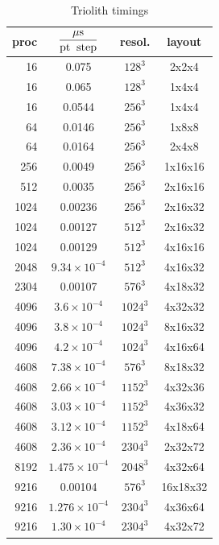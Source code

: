 \documentclass[\mydriver,12pt,twoside,notitlepage,a4paper]{article}
\begin{document}
\begin{table}[htb]
  \begin{center}
    \caption{Triolith timings}
    \label{Tsummary-Triolith}
    \begin{tabular}{rccc}
    \toprule
proc & $\displaystyle\frac{{\mu\rm s}}{\rm pt\;\;step}$ & resol. & layout \\
    \midrule
  16 &0.075& $128^3$ & 2x2x4  \\
  16 &0.065& $128^3$ & 1x4x4  \\
  16 &0.0544& $256^3$ & 1x4x4  \\  %
  64 &0.0146& $256^3$ & 1x8x8  \\  %
  64 &0.0164& $256^3$ & 2x4x8  \\
 256 &0.0049& $256^3$ & 1x16x16 \\ %
 512 &0.0035& $256^3$ & 2x16x16 \\ %
1024 &0.00236 &$256^3$ & 2x16x32 \\ %
1024 &0.00127 &$512^3$ & 2x16x32 \\ %
1024 &0.00129 &$512^3$ & 4x16x16 \\
2048 & $9.34{\times}10^{-4}$ &$ 512^3$&4x16x32 \\ %
2304 & 0.00107 &$ 576^3$&4x18x32 \\  %
4096 &$3.6{\times}10^{-4}$&$1024^3$&4x32x32 \\
4096 &$3.8{\times}10^{-4}$&$1024^3$&8x16x32 \\
4096 &$4.2{\times}10^{-4}$&$1024^3$&4x16x64 \\
4608 &$7.38{\times}10^{-4}$&$ 576^3$&8x18x32 \\ %
4608 &$2.66{\times}10^{-4}$&$1152^3$&4x32x36 \\ %
4608 &$3.03{\times}10^{-4}$&$1152^3$&4x36x32 \\ %
4608 &$3.12{\times}10^{-4}$&$1152^3$&4x18x64 \\ %
4608 &$2.36{\times}10^{-4}$&$2304^3$&2x32x72 \\ %
8192 &$1.475{\times}10^{-4}$&$2048^3$&4x32x64 \\ %
9216 & 0.00104 &$ 576^3$&16x18x32 \\ %
9216 &$1.276{\times}10^{-4}$&$2304^3$&4x36x64 \\ %
9216 &$1.30{\times}10^{-4}$&$2304^3$&4x32x72 \\ %
    \bottomrule
    \end{tabular}
  \end{center}
\end{table}
\end{document}
